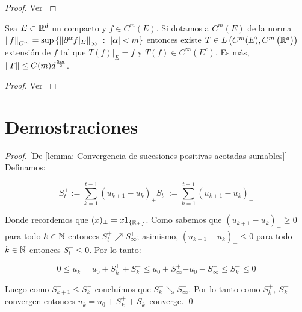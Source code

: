 \begin{proof}
	Ver \cite{dougherty:1989}
\end{proof}

\begin{theorem}
	\label{theorem: Extension de Whitney mejorado}
	Sea $E \subset {\mathbb{R}}^d$ un compacto y $f \in C^m(E)$. Si dotamos a $C^m(E)$ de la norma $\left\lVert f\right\rVert_{C^m} = \sup\left\lbrace\left\lVert\partial^{\alpha}f\vert_E \right\rVert_{\infty} ~:~ \left\lvert\alpha\right\rvert < m\right\rbrace$ entonces existe $T \in L\left(C^m(E), C^m\left({\mathbb{R}}^d \right) \right)$ extensi\'on de $f$ tal que $T(f) \vert_E = f$ y $T(f) \in C^{\infty}(E^c)$. Es m\'as, $\left\lVert T\right\rVert \leq C(m) d^{\frac{5m}{2}}$.
\end{theorem}

\begin{proof}
	Ver \cite{cheng:2015}
\end{proof}

\section{Demostraciones}

\begin{proof}{[De \ref{lemma: Convergencia de sucesiones positivas acotadas sumables}]}
	Definamos:
	
	\begin{subequations}
		\begin{equation}
		S^+_t := \sum\limits_{k=1}^{t-1} {\left(u_{k+1} - u_k\right)_+}
		\end{equation}
		\begin{equation}
		S^-_t := \sum\limits_{k=1}^{t-1} {\left(u_{k+1} - u_k\right)_-}
		\end{equation}
	\end{subequations}
	
	Donde recordemos que $(x)_{\pm} = x1_{\left\lbrace{\mathbb{R}}_{\pm}\right\rbrace}$. Como sabemos que $ {\left(u_{k+1} - u_k\right)_+} \geq 0$ para todo $k \in {\mathbb{N}}$ entonces $S_t^+ \nearrow S_{\infty}^+$; asimismo,  $ {\left(u_{k+1} - u_k\right)_-} \leq 0$ para todo $k \in {\mathbb{N}}$ entonces $S_t^- \leq 0$. Por lo tanto:
	
	\begin{subequations}
		\begin{equation}
		0 \leq u_k = u_0 + S_k^+ + S_k^- \leq u_0 + S_{\infty}^+
		\end{equation}
		\begin{equation}
		-u_0 - S_{\infty}^+ \leq S_k^- \leq 0
		\end{equation}
	\end{subequations}
	
	Luego como $S_{k+1}^- \leq S_k^-$ conclu\'imos que $S_{k}^- \searrow S_{\infty}^-$. Por lo tanto como $S_k^+, \ S_k^-$ convergen entonces $u_k = u_0 + S_k^+ + S_k^- $ converge. \qed
	
\end{proof}

